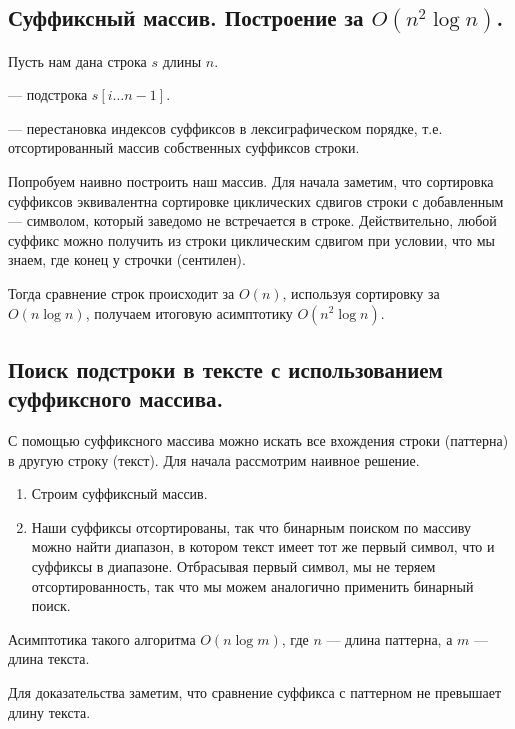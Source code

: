\subsection{Суффиксный массив. Построение за $O(n^2 \log n)$.}
Пусть нам дана строка $s$ длины $n$.
\begin{definition}
         --- подстрока $s[i\ldots n-1]$.
\end{definition}
\begin{definition}
         --- перестановка индексов суффиксов в лексиграфическом порядке, 
        т.е. отсортированный массив собственных суффиксов строки.
\end{definition}

Попробуем наивно построить наш массив. Для начала заметим, что сортировка суффиксов эквивалентна
сортировке циклических сдвигов строки с добавленным  --- символом, который заведомо
не встречается в строке. Действительно, любой суффикс можно получить из строки циклическим сдвигом при
условии, что мы знаем, где конец у строчки (сентилен).

Тогда сравнение строк происходит за $O(n)$, используя сортировку за $O(n\log n)$, получаем итоговую
асимптотику $O(n^2 \log n)$.

\subsection{Поиск подстроки в тексте с использованием суффиксного массива.}

С помощью суффиксного массива можно искать все вхождения строки (паттерна) в другую строку (текст). 
Для начала рассмотрим наивное решение.

\begin{enumerate}
        \item Строим суффиксный массив.
        \item Наши суффиксы отсортированы, так что бинарным поиском по массиву можно найти диапазон,
        в котором текст имеет тот же первый символ, что и суффиксы в диапазоне.
        Отбрасывая первый символ, мы не теряем отсортированность, так что мы можем аналогично
        применить бинарный поиск.
\end{enumerate}

\begin{remark}
        Асимптотика такого алгоритма $O(n \log m)$, где  $n$ --- длина паттерна, а $m$ --- длина текста.
\end{remark}
Для доказательства заметим, что сравнение суффикса с паттерном не превышает длину текста.

